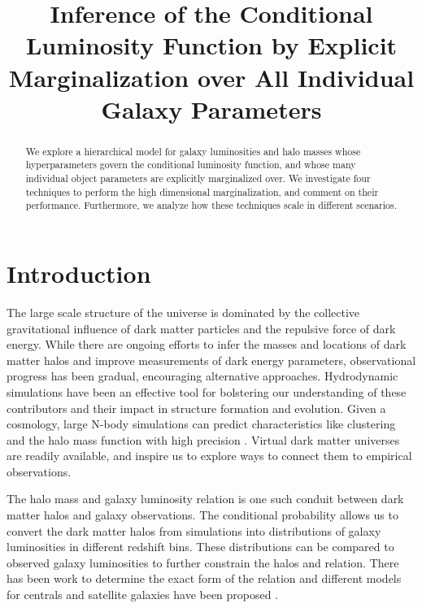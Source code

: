 \documentclass[\docopts]{\docclass}
\begin{document}
\title{ Inference of the Conditional Luminosity Function by Explicit Marginalization over All Individual Galaxy Parameters }

\maketitlepre

\begin{abstract}

We explore a hierarchical model for galaxy luminosities and halo masses whose hyperparameters govern the conditional luminosity function, and whose many individual object parameters are explicitly marginalized over. 
We investigate four techniques to perform the high dimensional marginalization, and comment on their performance.
Furthermore, we analyze how these techniques scale in different scenarios.

\end{abstract}


\maketitlepost

%

\section{Introduction}
\label{sec:intro}

The large scale structure of the universe is dominated by the collective gravitational influence of dark matter particles and the repulsive force of dark energy. While there are ongoing efforts to infer the masses and locations of dark matter halos and improve measurements of dark energy parameters, observational progress has been gradual, encouraging alternative approaches. 
Hydrodynamic simulations have been an effective tool for bolstering our understanding of these contributors and their impact in structure formation and evolution.
Given a cosmology, large N-body simulations can predict characteristics like clustering and the halo mass function with high precision \citep*[eg.][]{nbody}. Virtual dark matter universes are readily available, and inspire us to explore ways to connect them to empirical observations.  

The halo mass and galaxy luminosity relation is one such conduit between dark matter halos and galaxy observations. 
The conditional probability allows us to convert the dark matter halos from simulations into distributions of galaxy luminosities in different redshift bins. 
These distributions can be compared to observed galaxy luminosities to further constrain the halos and relation. 
There has been work to determine the exact form of the relation and different models for centrals and satellite galaxies have been proposed \citep[eg.][]{satellites}.
\end{document}
